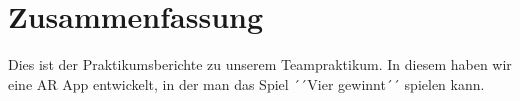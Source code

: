 \section{Zusammenfassung}
Dies ist der Praktikumsberichte zu unserem Teampraktikum. In diesem haben wir
eine AR App entwickelt, in der man das Spiel ´´Vier gewinnt´´ spielen kann. 
